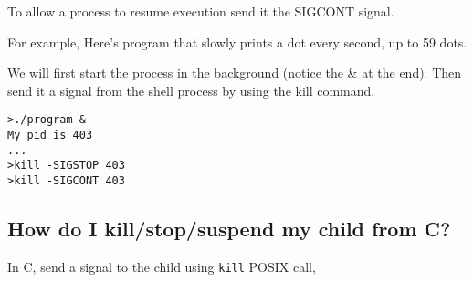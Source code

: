 To allow a process to resume execution send it the SIGCONT signal.

For example, Here's program that slowly prints a dot every second, up to
59 dots.

\begin{Shaded}
\end{Shaded}

We will first start the process in the background (notice the \& at the
end). Then send it a signal from the shell process by using the kill
command.

\begin{verbatim}
>./program &
My pid is 403
...
>kill -SIGSTOP 403
>kill -SIGCONT 403
\end{verbatim}

\subsection{How do I kill/stop/suspend my child from
C?}\label{how-do-i-killstopsuspend-my-child-from-c}

In C, send a signal to the child using \texttt{kill} POSIX call,

\begin{Shaded}
\begin{Highlighting}[]
\end{Highlighting}
\end{Shaded}

